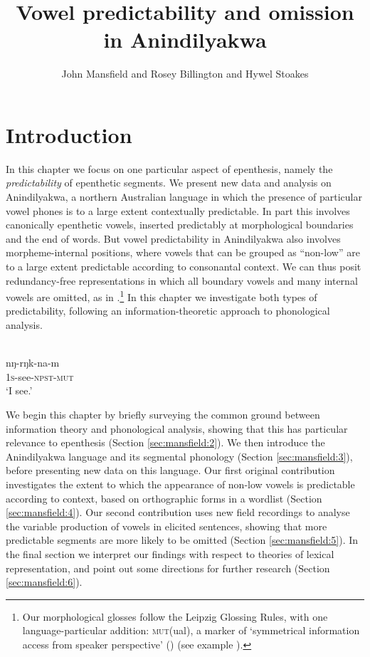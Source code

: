 \documentclass[output=paper,colorlinks,citecolor=brown]{langscibook}
\author{John Mansfield\affiliation{The University of Melbourne}\orcid{} and Rosey Billington\affiliation{The Australian National University}\orcid{} and  Hywel Stoakes\affiliation{The University of Melbourne}\orcid{0000-0002-5543-8750}}
\title{Vowel predictability and omission in Anindilyakwa}
\begin{document}
\maketitle 
\label{ch3}

\hypertarget{introduction}{%
\section{Introduction}\label{introduction}} 

In this chapter we focus on one particular aspect of epenthesis, namely the \emph{predictability} of epenthetic segments. We present new data and analysis on Anindilyakwa, a northern Australian language in which the presence of particular vowel phones is to a large extent contextually predictable. In part this involves canonically epenthetic vowels, inserted predictably at morphological boundaries and the end of words. But vowel predictability in Anindilyakwa also involves morpheme-internal positions, where vowels that can be grouped as “non-low” are to a large extent predictable according to consonantal context. We can thus posit redundancy\hyp free representations in which all boundary vowels and many internal vowels are omitted, as in .\footnote{Our morphological glosses follow the Leipzig Glossing Rules, with one language-particular addition: \textsc{mut}(ual), a marker of ‘symmetrical information access from speaker perspective’ (\citealt{Bednall2021}) (see example ).} 
In this chapter we investigate both types of predictability, following an information-theoretic approach to phonological analysis.

\ea
\label{ex:mansfield:1}
\\
  nŋ-rŋk-na-m\\
 \textsc{1s}{}-see-\textsc{npst-mut}\\
\glt ‘I see.’
\z
{}


We begin this chapter by briefly surveying the common ground between information theory and phonological analysis, showing that this has particular relevance to epenthesis (Section \ref{sec:mansfield:2}). We then introduce the Anindilyakwa language and its segmental phonology (Section \ref{sec:mansfield:3}), before presenting new data on this language. Our first original contribution investigates the extent to which the appearance of non-low vowels is predictable according to context, based on orthographic forms in a wordlist (Section \ref{sec:mansfield:4}). Our second contribution uses new field recordings to analyse the variable production of vowels in elicited sentences, showing that more predictable segments are more likely to be omitted (Section \ref{sec:mansfield:5}). In the final section we interpret our findings with respect to theories of lexical representation, and point out some directions for further research (Section \ref{sec:mansfield:6}).
\end{document}
